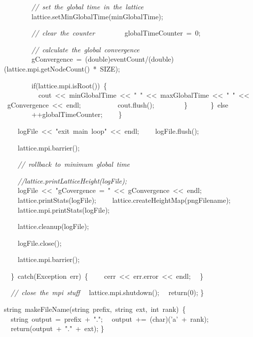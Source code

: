 {\ \ \ \ \ \ \ \ \textsl{//\ set\ the\ global\ time\ in\ the\ lattice}
\ \ \ \ \ \ \ \ lattice.setMinGlobalTime(minGlobalTime);

\ \ \ \ \ \ \ \ \textsl{//\ clear\ the\ counter}
\ \ \ \ \ \ \ \ globalTimeCounter\ =\ 0;

\ \ \ \ \ \ \ \ \textsl{//\ calculate\ the\ global\ convergence}
\ \ \ \ \ \ \ \ gConvergence\ =\ (double)eventCount/(double)(lattice.mpi.getNodeCount()\ *\ SIZE);

\ \ \ \ \ \ \ \ if(lattice.mpi.isRoot())\ \{
\ \ \ \ \ \ \ \ \ \ cout\ <{}<{}\ minGlobalTime\ <{}<{}\ "{}\ "{}\ <{}<{}\ maxGlobalTime\ <{}<{}\ "{}\ "{}\ <{}<{}\ gConvergence\ <{}<{}\ endl;
\ \ \ \ \ \ \ \ \ \ cout.flush();
\ \ \ \ \ \ \ \ \}
\ \ \ \ \ \ \}\ else
\ \ \ \ \ \ \ \ ++globalTimeCounter;
\ \ \ \ \}

\ \ \ \ logFile\ <{}<{}\ "{}exit\ main\ loop"{}\ <{}<{}\ endl;
\ \ \ \ logFile.flush();

\ \ \ \ lattice.mpi.barrier();

\ \ \ \ \textsl{//\ rollback\ to\ minimum\ global\ time}

\ \ \ \ \textsl{//lattice.printLatticeHeight(logFile);}
\ \ \ \ logFile\ <{}<{}\ "{}gCovergence\ =\ "{}\ <{}<{}\ gConvergence\ <{}<{}\ endl;
\ \ \ \ lattice.printStats(logFile);
\ \ \ \ lattice.createHeightMap(pngFilename);
\ \ \ \ lattice.mpi.printStats(logFile);

\ \ \ \ lattice.cleanup(logFile);

\ \ \ \ logFile.close();

\ \ \ \ lattice.mpi.barrier();

\ \ \}\ catch(Exception\ err)\ \{
\ \ \ \ cerr\ <{}<{}\ err.error\ <{}<{}\ endl;
\ \ \}

\ \ \textsl{//\ close\ the\ mpi\ stuff}
\ \ lattice.mpi.shutdown();
\ \ return(0);
\}

string\ makeFileName(string\ prefix,\ string\ ext,\ int\ rank)\ \{
\ \ string\ output\ =\ prefix\ +\ "{}."{};
\ \ output\ +=\ (char)('a'\ +\ rank);
\ \ return(output\ +\ "{}."{}\ +\ ext);
\}

 }
\normalfont\normalsize

